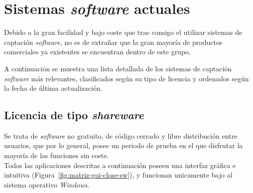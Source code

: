 \section{Sistemas \emph{software} actuales}
Debido a la gran facilidad y bajo coste que trae consigo el utilizar sistemas de captación \emph{software}, no es de extrañar que la gran mayoría de productos comerciales ya existentes se encuentran dentro de este grupo.

A continuación se muestra una lista detallada de los sistemas de captación \emph{software} más relevantes, clasificados según su tipo de licencia y ordenados según la fecha de última actualización.

\subsection{Licencia de tipo \emph{shareware}}
Se trata de \emph{software} no gratuito, de código cerrado y libre distribución entre usuarios\cite{hui2008economics}, que por lo general, posee un periodo de prueba en el que disfrutar la mayoría de las funciones sin coste. \\
Todos las aplicaciones descritas a continuación poseen una interfaz gráfica e intuitiva (Figura~\ref{fig:matriz-gui-close-sw}), y funcionan unicamente bajo al sistema operativo \emph{Windows\texttrademark}.

